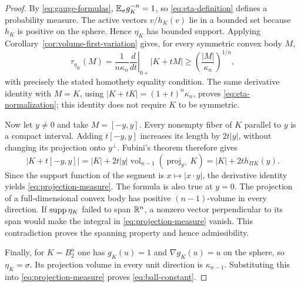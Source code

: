 \begin{proof}
By \eqref{eq:gauge-formulas}, $\mathbb E_{\sigma} g_K^{-n}=1$, so
\eqref{eq:eta-definition} defines a probability measure.  The active
vectors $v/h_K(v)$ lie in a bounded set because $h_K$ is positive
on the sphere.  Hence $\eta_K$ has bounded support.  Applying
Corollary~\ref{cor:volume-first-variation} gives, for every symmetric
convex body $M$,
\[
 \tau_{\eta_K}(M)
 =\frac1{n\kappa_n}
        \left.\frac{d}{dt}\right|_{0+}|K+tM|
 \ge\left(\frac{|M|}{\kappa_n}\right)^{1/n},
\]
with precisely the stated homothety equality condition.  The same
derivative identity with $M=K$, using
$|K+tK|=(1+t)^n\kappa_n$, proves
\eqref{eq:eta-normalization}; this identity does not require $K$
to be symmetric.

Now let $y\ne0$ and take $M=[-y,y]$.  Every nonempty fiber of
$K$ parallel to $y$ is a compact interval.  Adding $t[-y,y]$
increases its length by $2t|y|$, without changing its projection
onto $y^\perp$.  Fubini's theorem therefore gives
\[
 |K+t[-y,y]|=|K|+
     2t|y|\operatorname{vol}_{n-1}
                   (\operatorname{proj}_{y^\perp}K)
 =|K|+2t h_{\Pi K}(y).
\]
Since the support function of the segment is $x\mapsto|x\cdot y|$,
the derivative identity yields \eqref{eq:projection-measure}.
The formula is also true at $y=0$.  The projection of a
full-dimensional convex body has positive $(n-1)$-volume in every
direction.  If $\operatorname{supp}\eta_K$ failed to span $\mathbb R^n$, a nonzero
vector perpendicular to its span would make the integral in
\eqref{eq:projection-measure} vanish.  This contradiction proves
the spanning property and hence admissibility.

Finally, for $K=B_2^n$ one has $g_K(u)=1$ and
$\nabla g_K(u)=u$ on the sphere, so $\eta_K=\sigma$.
Its projection volume in every unit direction is $\kappa_{n-1}$.
Substituting this into \eqref{eq:projection-measure} proves
\eqref{eq:ball-constant}.
\end{proof}

